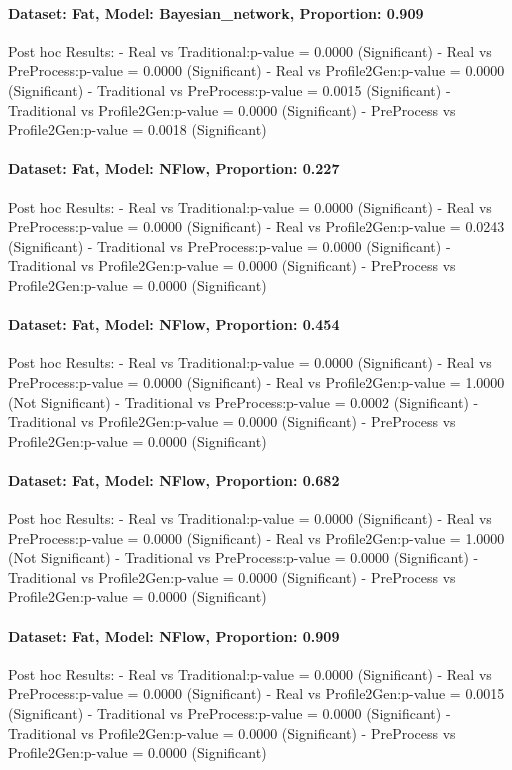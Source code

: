 \documentclass{article}
\theoremstyle{plain}
\theoremstyle{definition}
\theoremstyle{remark}
\begin{document}
\paragraph{Dataset: Fat, Model: Bayesian\_network, Proportion: 0.909
}Post hoc Results:
- Real vs Traditional:p-value = 0.0000 (Significant)
- Real vs PreProcess:p-value = 0.0000 (Significant)
- Real vs Profile2Gen:p-value = 0.0000 (Significant)
- Traditional vs PreProcess:p-value = 0.0015 (Significant)
- Traditional vs Profile2Gen:p-value = 0.0000 (Significant)
- PreProcess vs Profile2Gen:p-value = 0.0018 (Significant)

\paragraph{Dataset: Fat, Model: NFlow, Proportion: 0.227
}Post hoc Results:
- Real vs Traditional:p-value = 0.0000 (Significant)
- Real vs PreProcess:p-value = 0.0000 (Significant)
- Real vs Profile2Gen:p-value = 0.0243 (Significant)
- Traditional vs PreProcess:p-value = 0.0000 (Significant)
- Traditional vs Profile2Gen:p-value = 0.0000 (Significant)
- PreProcess vs Profile2Gen:p-value = 0.0000 (Significant)

\paragraph{Dataset: Fat, Model: NFlow, Proportion: 0.454
}Post hoc Results:
- Real vs Traditional:p-value = 0.0000 (Significant)
- Real vs PreProcess:p-value = 0.0000 (Significant)
- Real vs Profile2Gen:p-value = 1.0000 (Not Significant)
- Traditional vs PreProcess:p-value = 0.0002 (Significant)
- Traditional vs Profile2Gen:p-value = 0.0000 (Significant)
- PreProcess vs Profile2Gen:p-value = 0.0000 (Significant)

\paragraph{Dataset: Fat, Model: NFlow, Proportion: 0.682
}Post hoc Results:
- Real vs Traditional:p-value = 0.0000 (Significant)
- Real vs PreProcess:p-value = 0.0000 (Significant)
- Real vs Profile2Gen:p-value = 1.0000 (Not Significant)
- Traditional vs PreProcess:p-value = 0.0000 (Significant)
- Traditional vs Profile2Gen:p-value = 0.0000 (Significant)
- PreProcess vs Profile2Gen:p-value = 0.0000 (Significant)

\paragraph{Dataset: Fat, Model: NFlow, Proportion: 0.909
}Post hoc Results:
- Real vs Traditional:p-value = 0.0000 (Significant)
- Real vs PreProcess:p-value = 0.0000 (Significant)
- Real vs Profile2Gen:p-value = 0.0015 (Significant)
- Traditional vs PreProcess:p-value = 0.0000 (Significant)
- Traditional vs Profile2Gen:p-value = 0.0000 (Significant)
- PreProcess vs Profile2Gen:p-value = 0.0000 (Significant)
\end{document}
